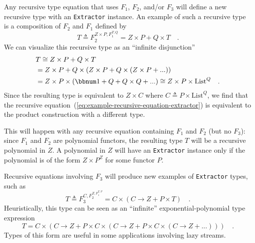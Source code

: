 Any recursive type equation that uses $F_{1}$, $F_{2}$, and/or $F_{3}$
will define a new recursive type with an \lstinline!Extractor! instance.
An example of such a recursive type is a composition of $F_{2}$ and
$F_{1}$ defined by
\begin{equation}
T\triangleq F_{2}^{Z\times P,F_{1}^{T,Q}}=Z\times P+Q\times T\quad.\label{eq:example-recursive-equation-extractor}
\end{equation}
We can visualize this recursive type as an ``infinite disjunction''
\begin{align*}
 & T\cong Z\times P+Q\times T\\
 & =Z\times P+Q\times\left(Z\times P+Q\times\left(Z\times P+...\right)\right)\\
 & =Z\times P\times(\bbnum 1+Q+Q\times Q+...)\cong Z\times P\times\text{List}^{Q}\quad.
\end{align*}
Since the resulting type is equivalent to $Z\times C$ where $C\triangleq P\times\text{List}^{Q}$,
we find that the recursive equation~(\ref{eq:example-recursive-equation-extractor})
is equivalent to the product construction with a different type.

This will happen with any recursive equation containing $F_{1}$ and
$F_{2}$ (but no $F_{3}$): since $F_{1}$ and $F_{2}$ are polynomial
functors, the resulting type $T$ will be a recursive polynomial in
$Z$. A polynomial in $Z$ will have an \lstinline!Extractor! instance
only if the polynomial is of the form $Z\times P^{Z}$ for some functor
$P$.

Recursive equations involving $F_{3}$ will produce new examples of
\lstinline!Extractor! types, such as
\begin{equation}
T\triangleq F_{3}^{C,F_{2}^{Z,F_{1}^{T,P}}}=C\times\left(C\rightarrow Z+P\times T\right)\quad.\label{eq:example-good-recursive-equation-extractor}
\end{equation}
Heuristically, this type can be seen as an ``infinite'' exponential-polynomial
type expression
\[
T=C\times\left(C\rightarrow Z+P\times C\times\left(C\rightarrow Z+P\times C\times\left(C\rightarrow Z+...\right)\right)\right)\quad.
\]
Types of this form are useful in some applications involving lazy
streams.

